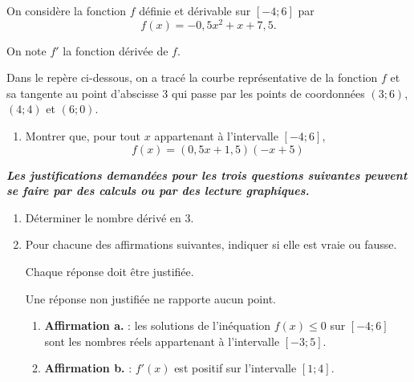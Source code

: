 On considère la fonction $f$ définie et dérivable sur $[-4 ; 6]$ par
\[f(x) = -0,5x^2 +  x + 7,5.\]

On note $f'$ la fonction dérivée de $f$.

Dans le repère ci-dessous, on a tracé la courbe représentative de la fonction $f$ et sa tangente au point d'abscisse 3 qui passe par les points de coordonnées $(3 ; 6)$, $(4 ; 4)$ et $(6 ; 0)$.

\begin{center}
\end{center}
\begin{enumerate}
\item Montrer que, pour tout $x$ appartenant à l'intervalle $[-4 ; 6]$,
\[
f(x)=(0,5x + 1,5)(-x+5)
\]
\end{enumerate}

\textbf{\emph{Les justifications demandées pour les trois questions suivantes peuvent se faire par des calculs ou par des lecture graphiques.}}


\begin{enumerate}[resume]
\item Déterminer le nombre dérivé en 3.
\item Pour chacune des affirmations suivantes, indiquer si elle est vraie ou fausse.

Chaque réponse doit être justifiée.

Une réponse non justifiée ne rapporte aucun point.
\begin{enumerate}
\item \textbf{Affirmation a.} : les solutions de l'inéquation $f(x)\leqslant 0$ sur $[-4 ; 6]$ sont les nombres réels appartenant à l'intervalle $[-3 ; 5]$.


\item \textbf{Affirmation b.} : $f'(x)$ est positif sur l'intervalle $[1 ; 4]$.
\end{enumerate}
\end{enumerate}
